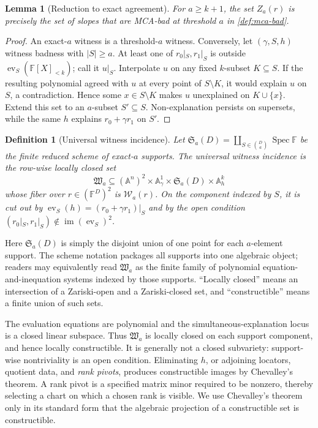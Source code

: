 \documentclass[12pt,a4paper]{amsart}
\numberwithin{equation}{section}
\newtheorem{lemma}[lemma]{Lemma}
\newtheorem{definition}[definition]{Definition}
\theoremstyle{remark}
\DeclareMathOperator{\Spec}{Spec}
\newcommand{\F}{\mathbb F}
\newcommand{\A}{\mathbb A}
\newcommand{\Wcal}{\mathcal W}
\newcommand{\abs}[1]{\lvert #1\rvert}
\begin{document}
\begin{lemma}[Reduction to exact agreement]
\label{lem:exact-agreement-reduction}
For \(a\ge k+1\), the set \(Z_a(r)\) is precisely the set of slopes that
are MCA-bad at threshold \(a\) in \cref{def:mca-bad}.
\end{lemma}

\begin{proof}
An exact-\(a\) witness is a threshold-\(a\) witness.  Conversely, let
\((\gamma,S,h)\) witness badness with \(\abs S\ge a\).  At least one of
\(r_0|_S,r_1|_S\) is outside
\(\operatorname{ev}_S(\F[X]_{<k})\); call it \(u|_S\).  Interpolate \(u\)
on any fixed \(k\)-subset \(K\subseteq S\).  If the resulting polynomial
agreed with \(u\) at every point of \(S\setminus K\), it would explain
\(u\) on \(S\), a contradiction.  Hence some \(x\in S\setminus K\)
makes \(u\) unexplained on \(K\cup\{x\}\).  Extend this set to an
\(a\)-subset \(S'\subseteq S\).  Non-explanation persists on supersets,
while the same \(h\) explains \(r_0+\gamma r_1\) on \(S'\).
\end{proof}

\begin{definition}[Universal witness incidence]
\label{def:universal-witness-incidence}
Let \(\mathfrak S_a(D)=\coprod_{S\in\binom Da}\Spec\F\) be the finite
reduced scheme of exact-\(a\) supports.  The \emph{universal witness
incidence} is the row-wise locally closed set
\[
 \mathfrak W_a\subseteq
 (\A^n)^2\times\A^1_\gamma\times
 \mathfrak S_a(D)\times\A^k_h
 \]
whose fiber over \(r\in(\F^D)^2\) is \(\Wcal_a(r)\).  On the component
indexed by \(S\), it is cut out by
\(\operatorname{ev}_S(h)=(r_0+\gamma r_1)|_S\) and by the open condition
\((r_0|_S,r_1|_S)\notin
 \operatorname{im}(\operatorname{ev}_S)^2\).
\end{definition}

Here \(\mathfrak S_a(D)\) is simply the disjoint union of one point for each
\(a\)-element support.  The scheme notation packages all supports into one
algebraic object; readers may equivalently read \(\mathfrak W_a\) as the
finite family of polynomial equation-and-inequation systems indexed by
those supports.  ``Locally closed'' means an intersection of a Zariski-open
and a Zariski-closed set, and ``constructible'' means a finite union of such
sets.

The evaluation equations are polynomial and the simultaneous-explanation
locus is a closed linear subspace.  Thus \(\mathfrak W_a\) is locally
closed on each support component, and hence locally constructible.  It is
generally not a closed subvariety: support-wise nontriviality is an open
condition.  Eliminating \(h\), or adjoining locators, quotient data, and
\emph{rank pivots}, produces constructible images by Chevalley's theorem.
A rank pivot is a specified matrix minor required to be nonzero, thereby
selecting a chart on which a chosen rank is visible.  We use Chevalley's
theorem only in its standard form that the algebraic projection of a
constructible set is constructible.
\end{document}
